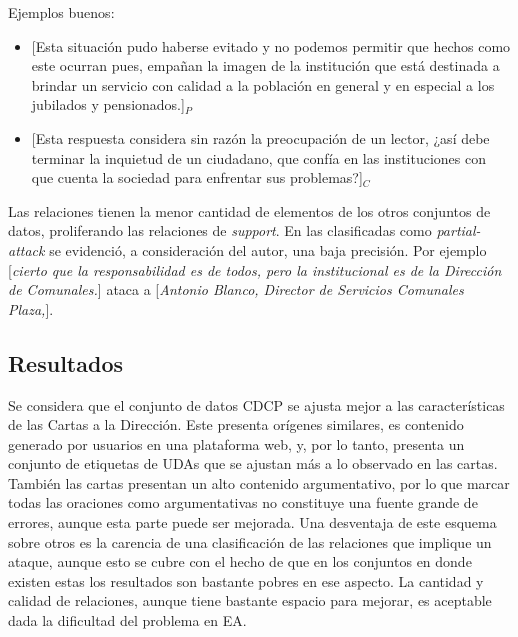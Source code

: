 Ejemplos buenos:
\begin{itemize}
	\item \text{} [Esta situación pudo haberse evitado y no podemos permitir que hechos como este ocurran pues, 
	empañan la imagen de la institución que está destinada a brindar un servicio con calidad a la población en 
	general y en especial a los jubilados y pensionados.]$_P$ %
	\item \text{} [Esta respuesta considera sin razón la preocupación de un lector, 
	¿así debe terminar la inquietud de un ciudadano, que confía en las instituciones con que cuenta la 
	sociedad para enfrentar sus problemas?]$_C$ %
\end{itemize}

Las relaciones tienen la menor cantidad de elementos de los otros conjuntos de datos, proliferando
las relaciones de \emph{support}. En las clasificadas como \emph{partial-attack} se evidenció, a 
consideración del autor, una baja precisión. Por ejemplo 
[\emph{cierto que la responsabilidad es de todos, pero la institucional es de la Dirección de Comunales.}]
ataca a [\emph{Antonio Blanco, Director de Servicios Comunales Plaza,}].

\subsection{Resultados}

Se considera que el conjunto de datos CDCP se ajusta mejor a las características de las Cartas 
a la Dirección. Este presenta orígenes similares, es contenido generado por usuarios en una plataforma
web, y, por lo tanto, presenta un conjunto de etiquetas de UDAs que se ajustan más a lo observado 
en las cartas. También las cartas presentan un alto contenido argumentativo, por lo que marcar 
todas las oraciones como argumentativas no constituye una fuente grande de errores, aunque esta 
parte puede ser mejorada. Una desventaja de este esquema sobre otros es la carencia de una 
clasificación de las relaciones que implique un ataque, aunque esto se cubre con el hecho de 
que en los conjuntos en donde existen estas los resultados son bastante pobres en ese aspecto. La cantidad 
y calidad de relaciones, aunque tiene bastante espacio para mejorar, es aceptable dada la dificultad 
del problema en EA.

